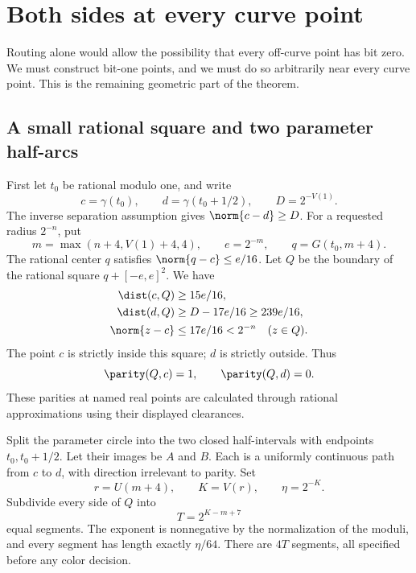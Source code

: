 \section{Both sides at every curve point}\label{sec:boundary}

Routing alone would allow the possibility that every off-curve point
has bit zero. We must construct bit-one points, and we must do so
arbitrarily near every curve point. This is the remaining geometric
part of the theorem.

\subsection{A small rational square and two parameter half-arcs}

First let $t_0$ be rational modulo one, and write
\[
 c=\gamma(t_0),\qquad d=\gamma(t_0+1/2),\qquad
 D=2^{-V(1)}.
\]
The inverse separation assumption gives $\norm{c-d}\ge D$.
For a requested radius $2^{-n}$, put
\begin{equation}
 m=\max(n+4,V(1)+4,4),\qquad e=2^{-m},\qquad
 q=G(t_0,m+4).
 \label{eq:localsquare}
\end{equation}
The rational center $q$ satisfies $\norm{q-c}\le e/16$.
Let $Q$ be the boundary of the rational square
$q+[-e,e]^2$. We have
\begin{align}
 \dist(c,Q)&\ge15e/16,\label{eq:insideq}\\
 \dist(d,Q)&\ge D-17e/16\ge239e/16,\label{eq:outsideq}\\
 \norm{z-c}&\le17e/16<2^{-n}\quad(z\in Q).\label{eq:qnear}
\end{align}
The point $c$ is strictly inside this square; $d$ is strictly outside.
Thus
\begin{equation}
                      \parity(Q,c)=1,\qquad \parity(Q,d)=0.
 \label{eq:qvalues}
\end{equation}
These parities at named real points are calculated through rational
approximations using their displayed clearances.

Split the parameter circle into the two closed half-intervals with
endpoints $t_0,t_0+1/2$. Let their images be $A$ and $B$.
Each is a uniformly continuous path from $c$ to $d$,
with direction irrelevant to parity.
Set
\begin{equation}
 r=U(m+4),\qquad K=V(r),\qquad \eta=2^{-K}.
 \label{eq:localscale}
\end{equation}
Subdivide every side of $Q$ into
\begin{equation}
                     T=2^{K-m+7}
 \label{eq:Tsquare}
\end{equation}
equal segments. The exponent is nonnegative by the normalization
of the moduli, and every segment has length exactly $\eta/64$.
There are $4T$ segments, all specified before any color decision.

